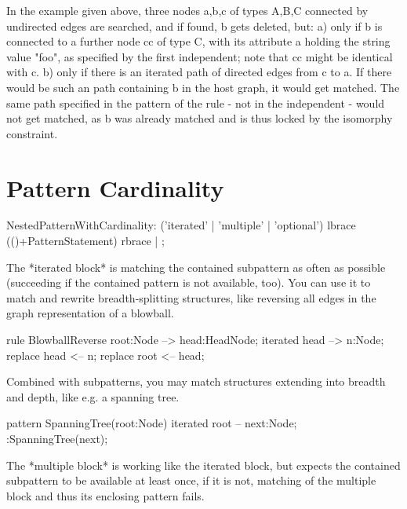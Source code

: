 In the example given above, three nodes a,b,c of types A,B,C
connected by undirected edges are searched, and if found, b gets deleted, but:
a) only if b is connected to a further node cc of type C,
with its attribute a holding the string value "foo", as specified 
by the first independent; note that cc might be identical with c.
b) only if there is an iterated path of directed edges from c to a.
If there would be such an path containing b in the host graph, 
it would get matched. The same path specified in the pattern of the rule 
- not in the independent - would not get matched, as b was already matched
and is thus locked by the isomorphy constraint.

  
\section{Pattern Cardinality}
\label{pc}

\begin{rail}  
  NestedPatternWithCardinality: 
    ('iterated' | 'multiple' | 'optional') lbrace (()+PatternStatement) rbrace |
    ;
\end{rail}

The *iterated block* is matching the contained subpattern as often as possible
(succeeding if the contained pattern is not available, too).
You can use it to match and rewrite breadth-splitting structures,
like reversing all edges in the graph representation of a blowball.

\begin{example}
  \begin{grgen}
rule BlowballReverse {
  root:Node --> head:HeadNode;
  iterated {
    head --> n:Node;
	replace {
	  head <-- n;
	}
  }
  replace { 
    root <-- head;
  }
}
  \end{grgen}
\end{example}

Combined with subpatterns, you may match structures extending into breadth and depth,
like e.g. a spanning tree.

\begin{example}
  \begin{grgen}
pattern SpanningTree(root:Node)
{
  iterated {
    root -- next:Node;
    :SpanningTree(next);
  }
}
  \end{grgen}
\end{example}

The *multiple block* is working like the iterated block, 
but expects the contained subpattern to be available at least once,
if it is not, matching of the multiple block and thus its enclosing pattern fails.

